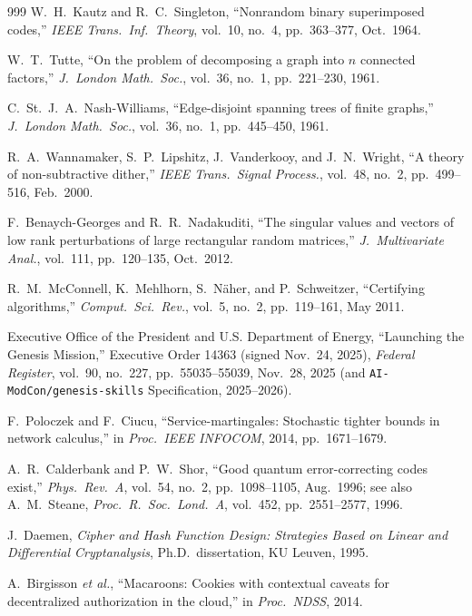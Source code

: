 \documentclass[11pt,letterpaper]{article}
\theoremstyle{spectralthm}
\begin{document}
\begin{thebibliography}{999}
W.~H.~Kautz and R.~C.~Singleton, ``Nonrandom binary superimposed codes,'' \textit{IEEE Trans.\ Inf.\ Theory}, vol.~10, no.~4, pp.~363--377, Oct.\ 1964.

W.~T.~Tutte, ``On the problem of decomposing a graph into $n$ connected factors,'' \textit{J.\ London Math.\ Soc.}, vol.~36, no.~1, pp.~221--230, 1961.

C.~St.~J.~A.~Nash-Williams, ``Edge-disjoint spanning trees of finite graphs,'' \textit{J.\ London Math.\ Soc.}, vol.~36, no.~1, pp.~445--450, 1961.

R.~A.~Wannamaker, S.~P.~Lipshitz, J.~Vanderkooy, and J.~N.~Wright, ``A theory of non-subtractive dither,'' \textit{IEEE Trans.\ Signal Process.}, vol.~48, no.~2, pp.~499--516, Feb.\ 2000.

F.~Benaych-Georges and R.~R.~Nadakuditi, ``The singular values and vectors of low rank perturbations of large rectangular random matrices,'' \textit{J.\ Multivariate Anal.}, vol.~111, pp.~120--135, Oct.\ 2012.

R.~M.~McConnell, K.~Mehlhorn, S.~N\"{a}her, and P.~Schweitzer, ``Certifying algorithms,'' \textit{Comput.\ Sci.\ Rev.}, vol.~5, no.~2, pp.~119--161, May 2011.

Executive Office of the President and U.S. Department of Energy, ``Launching the Genesis Mission,'' Executive Order 14363 (signed Nov.\ 24, 2025), \emph{Federal Register}, vol.~90, no.~227, pp.~55035--55039, Nov.\ 28, 2025 (and \texttt{AI-ModCon/genesis-skills} Specification, 2025--2026).

F.~Poloczek and F.~Ciucu, ``Service-martingales: Stochastic tighter bounds in network calculus,'' in \textit{Proc.\ IEEE INFOCOM}, 2014, pp.~1671--1679.

A.~R.~Calderbank and P.~W.~Shor, ``Good quantum error-correcting codes exist,'' \textit{Phys.\ Rev.\ A}, vol.~54, no.~2, pp.~1098--1105, Aug.\ 1996; see also A.~M.~Steane, \textit{Proc.\ R.\ Soc.\ Lond.\ A}, vol.~452, pp.~2551--2577, 1996.

J.~Daemen, \textit{Cipher and Hash Function Design: Strategies Based on Linear and Differential Cryptanalysis}, Ph.D.\ dissertation, KU Leuven, 1995.

A.~Birgisson \textit{et al.}, ``Macaroons: Cookies with contextual caveats for decentralized authorization in the cloud,'' in \textit{Proc.\ NDSS}, 2014.


\end{thebibliography}
\end{document}
